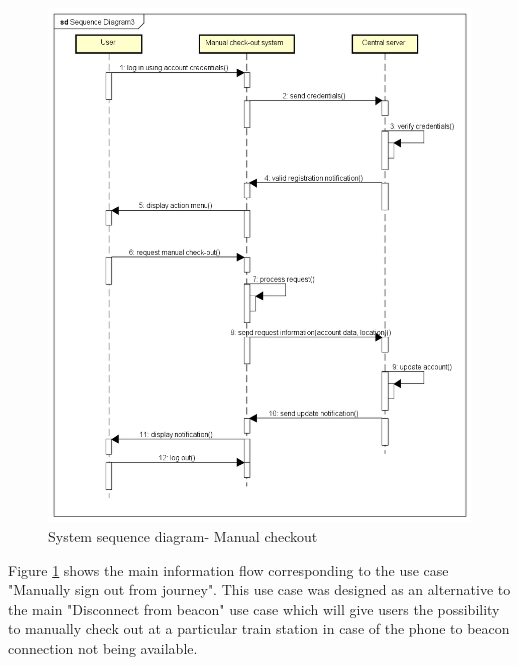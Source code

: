 \begin{figure}[H]
	\centering
	\includegraphics[width=\textwidth]{Pictures/seq_diagram_manualCheckOut.png}
	\caption{System sequence diagram- Manual checkout}
	\label{fig:seqDiagram4}
\end{figure}
Figure \ref{fig:seqDiagram4} shows the main information flow corresponding to the use case "Manually sign out from journey". This use case was designed as an alternative to the main "Disconnect from beacon" use case which will give users the possibility to manually check out at a particular train station in case of the phone to beacon connection not being available.

